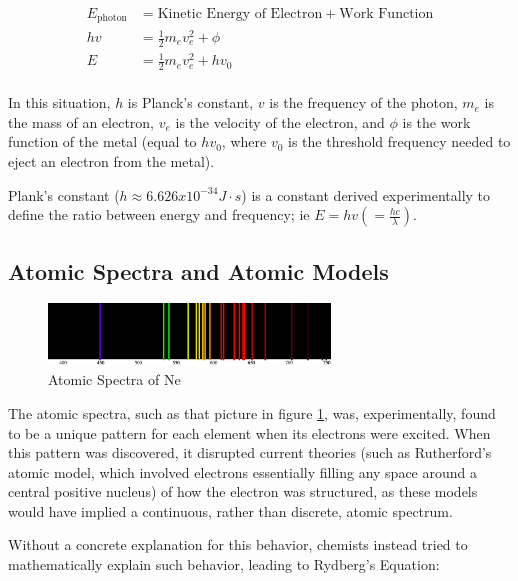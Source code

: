 \documentclass[12pt]{article}
\begin{document}
    \begin{equation}
        \begin{split}
        E_{\text{photon}} &= \text{Kinetic Energy of Electron} + \text{Work Function}\\
        hv &= \frac{1}{2}m_e v_e^2 + \phi\\
        E &= \frac{1}{2}m_e v_e^2 + hv_0\\
        \end{split}
    \end{equation}

In this situation, $h$ is Planck's constant, $v$ is the frequency of the photon, $m_e$ is the mass of an electron, $v_e$ is the velocity of the electron, and $\phi$ is the work function of the metal (equal to $hv_0$, where $v_0$ is the threshold frequency needed to eject an electron from the metal).

Plank's constant ($h\approx 6.626x10^{-34} J \cdot s$) is a constant derived experimentally to define the ratio between energy and frequency; ie $E = hv (=\frac{hc}{\lambda})$.

\subsection{Atomic Spectra and Atomic Models}

\begin{figure}[!ht]
    \centering
    \includegraphics[width=7.5cm]{misc/neonatomicspectra.png}
    \caption{Atomic Spectra of Ne}
    \label{fig:atomicspectra}
\end{figure}

The atomic spectra, such as that picture in figure \ref*{fig:atomicspectra}, was, experimentally, found to be a unique pattern for each element when its electrons were excited. When this pattern was discovered, it disrupted current theories (such as Rutherford's atomic model, which involved electrons essentially filling any space around a central positive nucleus) of how the electron was structured, as these models would have implied a continuous, rather than discrete, atomic spectrum. 

Without a concrete explanation for this behavior, chemists instead tried to mathematically explain such behavior, leading to Rydberg's Equation:
\end{document}

